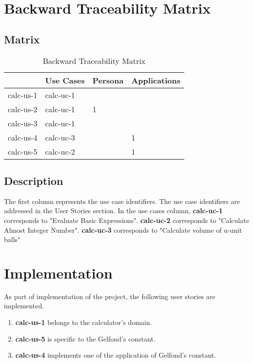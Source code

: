 \documentclass{article}
\begin{document}
\clearpage
\section{Backward Traceability Matrix}
\subsection{Matrix}
\begin{table}[h]
\centering
\begin{tabular}{|p{2cm}|p{2cm}|p{2cm}|p{2.2cm}|}
\hline
\textbf{} & \textbf{Use Cases} & \textbf{Persona} & \textbf{Applications} \\
\hline
{calc-us-1} & {calc-uc-1} & {} & {}\\
\hline
{calc-us-2} & {calc-uc-1} & {1} & {}\\
\hline
{calc-us-3} & {calc-uc-1} & {} & {}\\
\hline
{calc-us-4} & {calc-uc-3} & {} & {1}\\
\hline
{calc-us-5} & {calc-uc-2} & {} & {1}\\
\hline
\end{tabular}
\caption{Backward Traceability Matrix}
\end{table}

\subsection{Description}
\justifying
The first column represents the use case identifiers. The use case identifiers are addressed in the User Stories section.\newline \newline
In the use cases column, \textbf{calc-uc-1} corresponds to "Evaluate Basic Expressions". \textbf{calc-uc-2} corresponds to "Calculate Almost Integer Number". \textbf{calc-uc-3} corresponds to "Calculate volume of u-unit balls"

\section{Implementation}
\justifying
As part of implementation of the project, the following user stories are implemented.
\begin{enumerate}
    \item \textbf{calc-us-1} belongs to the calculator's domain.
    \item \textbf{calc-us-5} is specific to the Gelfond's constant.
    \item \textbf{calc-us-4} implements one of the application of Gelfond's constant.
\end{enumerate}
\end{document}
